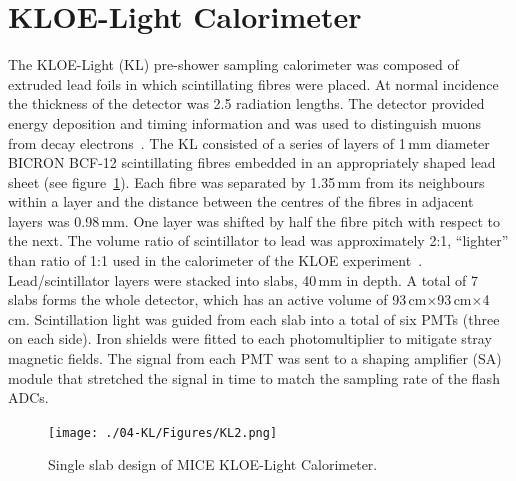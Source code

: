 \graphicspath{ {04-KL/Figures/} }

\section{KLOE-Light Calorimeter}
\label{Sect:KL}

The KLOE-Light (KL) pre-shower sampling calorimeter was composed of
extruded lead foils in which scintillating fibres were placed.
At normal incidence the thickness of the detector was 2.5 radiation
lengths.
The detector provided energy deposition and timing information and was
used to distinguish muons from decay
electrons~\cite{2016JInst..11P3001A}.
The KL consisted of a series of layers of 1\,mm diameter BICRON BCF-12
scintillating fibres embedded in an appropriately shaped lead sheet
(see figure~\ref{fig:KL2}).
Each fibre was separated by 1.35\,mm from its neighbours within a
layer and the distance between the centres of the fibres in adjacent
layers was 0.98\,mm.
One layer was shifted by half the fibre pitch with respect to the next.
The volume ratio of scintillator to lead was approximately 2:1,
``lighter'' than ratio of 1:1 used in the calorimeter of the KLOE
experiment~\cite{Ambrosino:2009zza}. 
Lead/scintillator layers were stacked into slabs, 40\,mm in depth.
A total of 7 slabs forms the whole detector, which has an active
volume of 93\,cm$\times$93\,cm$\times$4\,cm.
Scintillation light was guided from each slab into a total of six PMTs
(three on each side).
Iron shields were fitted to each photomultiplier to mitigate stray magnetic fields.
The signal from each PMT was sent to a shaping amplifier (SA) module
that stretched the signal in time to match the sampling rate
of the flash ADCs. \\
\begin{figure}
  \begin{center}
    \texttt{[image: ./04-KL/Figures/KL2.png]}
    \caption{Single slab design of MICE KLOE-Light Calorimeter.}
    \label{fig:KL2}
  \end{center}
\end{figure}

